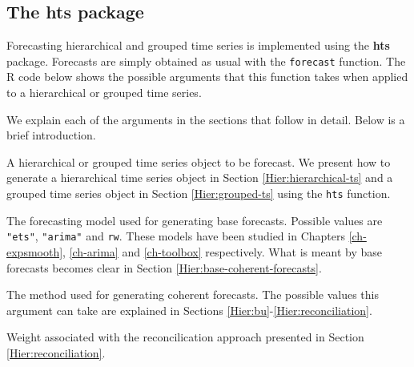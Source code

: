 \documentclass[]{book}
\newenvironment{Shaded}{\begin{snugshade}}{\end{snugshade}}
\newcommand{\DataTypeTok}[1]{\textcolor[rgb]{0.13,0.29,0.53}{#1}}
\newcommand{\DecValTok}[1]{\textcolor[rgb]{0.00,0.00,0.81}{#1}}
\newcommand{\KeywordTok}[1]{\textcolor[rgb]{0.13,0.29,0.53}{\textbf{#1}}}
\newcommand{\NormalTok}[1]{#1}
\newcommand{\OperatorTok}[1]{\textcolor[rgb]{0.81,0.36,0.00}{\textbf{#1}}}
\newcommand{\StringTok}[1]{\textcolor[rgb]{0.31,0.60,0.02}{#1}}
\providecommand{\tightlist}{%
  \setlength{\itemsep}{0pt}\setlength{\parskip}{0pt}}
\begin{document}
\hypertarget{the-hts-package}{%
\subsection*{The hts package}\label{the-hts-package}}

Forecasting hierarchical and grouped time series is implemented using the \textbf{hts} package. Forecasts are simply obtained as usual with the \texttt{forecast} function. The R code below shows the possible arguments that this function takes when applied to a hierarchical or grouped time series.

\begin{Shaded}
\end{Shaded}

We explain each of the arguments in the sections that follow in detail. Below is a brief introduction.

\begin{description}
\tightlist
\item[\texttt{object}]
A hierarchical or grouped time series object to be forecast. We present how to generate a hierarchical time series object in Section \ref{Hier:hierarchical-ts} and a grouped time series object in Section \ref{Hier:grouped-ts} using the \texttt{hts} function.
\item[\texttt{fmethod}]
The forecasting model used for generating base forecasts. Possible values are \texttt{"ets"}, \texttt{"arima"} and \texttt{rw}. These models have been studied in Chapters \ref{ch-expsmooth}, \ref{ch-arima} and \ref{ch-toolbox} respectively. What is meant by base forecasts becomes clear in Section \ref{Hier:base-coherent-forecasts}.
\item[\texttt{method}]
The method used for generating coherent forecasts. The possible values this argument can take are explained in Sections \ref{Hier:bu}-\ref{Hier:reconciliation}.
\item[\texttt{weights}]
Weight associated with the reconcilication approach presented in Section \ref{Hier:reconciliation}.
\end{description}
\end{document}
